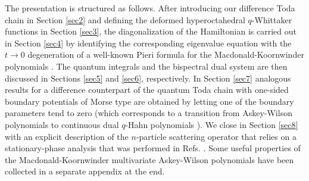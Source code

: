 \documentclass[reqno]{amsart}
\theoremstyle{remark}
\numberwithin{equation}{section}
\begin{document}
The presentation is structured as follows. After introducing our difference Toda chain in Section \ref{sec2} and defining the deformed hyperoctahedral $q$-Whittaker functions in Section \ref{sec3}, the diagonalization of the Hamiltonian is carried out in Section \ref{sec4} by identifying the corresponding eigenvalue equation with the 
$t\to 0$ degeneration of a well-known  Pieri formula for the Macdonald-Koornwinder polynomials \cite{die:properties,mac:affine}.
The quantum integrals and the bispectral dual system are then discussed in Sections \ref{sec5} and \ref{sec6}, respectively. In Section \ref{sec7} analogous results
for a difference counterpart of the quantum Toda chain
with one-sided boundary potentials of Morse type are obtained by letting one of the boundary parameters tend to zero (which corresponds to a transition
from Askey-Wilson polynomials to continuous dual $q$-Hahn polynomials
\cite{koe-les-swa:hypergeometric}). We close in Section \ref{sec8} with an explicit description of the $n$-particle scattering operator that relies on a stationary-phase analysis that was performed in Refs. \cite{rui:factorized,die:scattering}.
Some useful properties of the Macdonald-Koornwinder multivariate Askey-Wilson polynomials have been collected in a separate appendix at the end.
\end{document}
